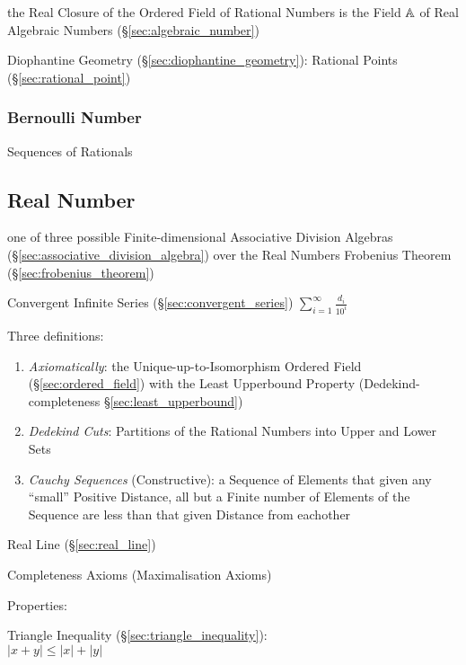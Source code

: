 the Real Closure of the Ordered Field of Rational Numbers is the Field
$\mathbb{A}$ of Real Algebraic Numbers (\S\ref{sec:algebraic_number})

\fist Diophantine Geometry (\S\ref{sec:diophantine_geometry}): Rational Points
(\S\ref{sec:rational_point})



\subsubsection{Bernoulli Number}\label{sec:bernoulli_number}

Sequences of Rationals




\subsection{Real Number}\label{sec:real_number}

one of three possible Finite-dimensional Associative Division Algebras
(\S\ref{sec:associative_division_algebra}) over the Real Numbers \fist
Frobenius Theorem (\S\ref{sec:frobenius_theorem})

Convergent Infinite Series (\S\ref{sec:convergent_series}) $\sum_{i =
  1}^{\infty} \frac{d_i}{10^i}$

Three definitions:
\begin{enumerate}
  \item \emph{Axiomatically}: the Unique-up-to-Isomorphism Ordered Field
    (\S\ref{sec:ordered_field}) with the Least Upperbound Property
    (Dedekind-completeness \S\ref{sec:least_upperbound})
  \item \emph{Dedekind Cuts}: Partitions of the Rational Numbers into
    Upper and Lower Sets
  \item \emph{Cauchy Sequences} (Constructive): a Sequence of Elements that
    given any ``small'' Positive Distance, all but a Finite number of Elements
    of the Sequence are less than that given Distance from eachother
\end{enumerate}

Real Line (\S\ref{sec:real_line})

Completeness Axioms (Maximalisation Axioms)

Properties:

Triangle Inequality (\S\ref{sec:triangle_inequality}):\\
$|x + y| \leq |x| + |y|$


